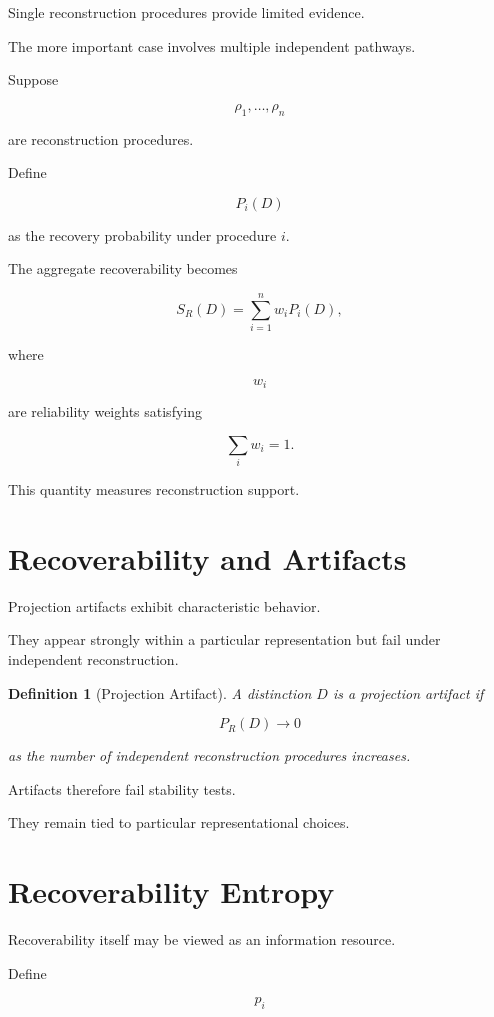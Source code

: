\documentclass[11pt,oneside,openany]{book}
\newtheorem{definition}{Definition}[chapter] \newtheorem{theorem}{Theorem}[chapter] \newtheorem{proposition}{Proposition}[chapter] \newtheorem{lemma}{Lemma}[chapter] \newtheorem{corollary}{Corollary}[chapter] \newtheorem{remark}{Remark}[chapter]
\begin{document}
Single reconstruction procedures provide limited evidence.

The more important case involves multiple independent pathways.

Suppose

\[
\rho_1,\ldots,\rho_n
\]

are reconstruction procedures.

Define

\[
P_i(D)
\]

as the recovery probability under procedure \(i\).

The aggregate recoverability becomes

\[
S_R(D)
=
\sum_{i=1}^{n}
w_iP_i(D),
\]

where

\[
w_i
\]

are reliability weights satisfying

\[
\sum_i w_i=1.
\]

This quantity measures reconstruction support.

\section{Recoverability and Artifacts}

Projection artifacts exhibit characteristic behavior.

They appear strongly within a particular representation but fail under independent reconstruction.

\begin{definition}[Projection Artifact]

A distinction \(D\) is a projection artifact if

\[
P_R(D)
\rightarrow 0
\]

as the number of independent reconstruction procedures increases.

\end{definition}

Artifacts therefore fail stability tests.

They remain tied to particular representational choices.

\section{Recoverability Entropy}

Recoverability itself may be viewed as an information resource.

Define

\[
p_i
\]
\end{document}

